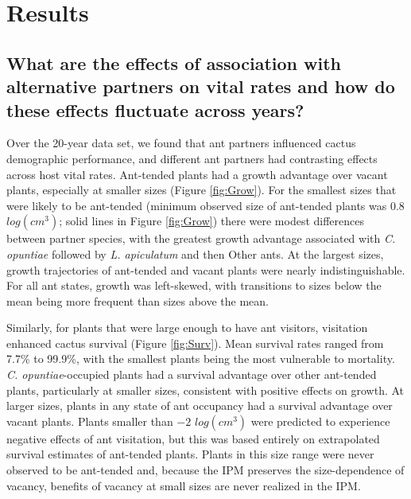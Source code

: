 \documentclass[11pt]{article}
\begin{document}
\section*{Results}
\subsection*{What are the effects of association with alternative partners on vital rates and how do these effects fluctuate across years?}
Over the 20-year data set, we found that ant partners influenced cactus demographic performance, and different ant partners had contrasting effects across host vital rates. 
Ant-tended plants had a growth advantage over vacant plants, especially at smaller sizes (Figure \ref{fig:Grow}).
For the smallest sizes that were likely to be ant-tended (minimum observed size of ant-tended plants was $0.8$ $log(cm^3)$; solid lines in Figure \ref{fig:Grow}) there were modest differences between partner species, with the greatest growth advantage associated with \textit{C. opuntiae} followed by \textit{L. apiculatum} and then Other ants.
At the largest sizes, growth trajectories of ant-tended and vacant plants were nearly indistinguishable. 
For all ant states, growth was left-skewed, with transitions to sizes below the mean being more frequent than sizes above the mean. 

Similarly, for plants that were large enough to have ant visitors, visitation enhanced cactus survival (Figure \ref{fig:Surv}). 
Mean survival rates ranged from 7.7\% to 99.9\%, with the smallest plants being the most vulnerable to mortality. 
\textit{C. opuntiae}-occupied plants had a survival advantage over other ant-tended plants, particularly at smaller sizes, consistent with positive effects on growth. 
At larger sizes, plants in any state of ant occupancy had a survival advantage over vacant plants. 
Plants smaller than $-2$ $log(cm^3)$ were predicted to experience negative effects of ant visitation, but this was based entirely on extrapolated survival estimates of ant-tended plants. 
Plants in this size range were never observed to be ant-tended and, because the IPM preserves the size-dependence of vacancy, benefits of vacancy at small sizes are never realized in the IPM. 
\end{document}
